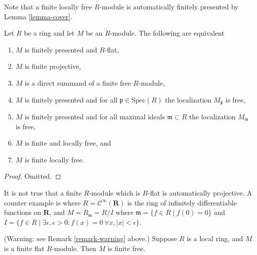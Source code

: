 \noindent
Note that a finite locally free $R$-module is
automatically finitely presented by Lemma \ref{lemma-cover}.

\begin{lemma}
\label{lemma-finite-projective}
Let $R$ be a ring and let $M$ be an $R$-module.
The following are equivalent
\begin{enumerate}
\item $M$ is finitely presented and $R$-flat,
\item $M$ is finite projective,
\item $M$ is a direct summand of a finite free $R$-module,
\item $M$ is finitely presented and
for all $\mathfrak p \in \text{Spec}(R)$ the
localization $M_{\mathfrak p}$ is free,
\item $M$ is finitely presented and
for all maximal ideals $\mathfrak m \subset R$ the
localization $M_{\mathfrak m}$ is free,
\item $M$ is finite and locally free, and
\item $M$ is finite locally free.
\end{enumerate}
\end{lemma}

\begin{proof}
Omitted.
\end{proof}

\begin{remark}
\label{remark-warning}
It is not true that a finite $R$-module which is
$R$-flat is automatically projective. A counter
example is where $R = \mathcal{C}^\infty(\mathbf{R})$
is the ring of infinitely differentiable functions on
$\mathbf{R}$, and $M = R_{\mathfrak m} = R/I$ where
$\mathfrak m = \{f \in R \mid f(0) = 0\}$ and
$I = \{f \in R \mid \exists \epsilon, \epsilon > 0 :
f(x) = 0\ \forall x, |x| < \epsilon\}$.
\end{remark}

\begin{lemma}
\label{lemma-finite-flat-local}
(Warning: see Remark \ref{remark-warning} above.)
Suppose $R$ is a local ring, and $M$ is a finite
flat $R$-module. Then $M$ is finite free.
\end{lemma}

